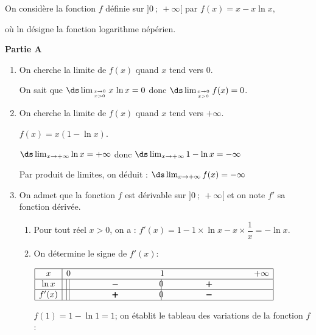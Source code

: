 \medskip

On considère la fonction $f$  définie sur $]0~;~+\infty[$ par 
$f(x) = x - x \ln x,$

où ln désigne la fonction logarithme népérien.

\bigskip

\textbf{Partie A}

\medskip

\begin{enumerate}
\item On cherche la limite de $f(x)$ quand $x$ tend vers $0$.

On sait que $\ds\lim_{x\to 0 \atop x>0} x\,\ln x=0$ donc $\ds\lim_{x\to 0 \atop x>0} f(x) = 0$.

\item On cherche la limite de $f(x)$ quand $x$ tend vers $+\infty$.

$f(x)=x\left (1 - \ln x\right )$.

$\ds\lim_{x\to +\infty} \ln x = +\infty$ donc $\ds\lim_{x\to +\infty} 1- \ln x = -\infty$

Par produit de limites, on déduit : $\ds\lim_{x\to +\infty} f(x) = -\infty$

\item On admet que la fonction $f$ est dérivable sur $]0~;~+\infty[$ et on note $f'$ sa fonction dérivée.
	\begin{enumerate}
		\item Pour tout réel $x > 0$, on a :
		$f'(x) = 1 - 1\times \ln x - x\times \dfrac{1}{x} = - \ln x$.
		
		\item 
		
On détermine le signe de $f'(x)$:

\begin{center}
{\renewcommand{\arraystretch}{1.5}
\def\esp{\hspace*{3cm}}
$\begin{array}{|c |l *{4}{c} |} 
\hline
x  & 0 & \esp & 1 & \esp  & +\infty \\
\hline
\ln x &\vline\;\vline  & \pmb{-} &  \vline\hspace{-2.7pt}{0} & \pmb{+} &   \\
\hline
f'(x) &\vline\;\vline  & \pmb{+} &  \vline\hspace{-2.7pt}{0} & \pmb{-} &   \\
\hline
\end{array}$
}
\end{center}
		
$f(1) = 1 -\ln 1=1$; on établit le tableau des variations de la fonction $f$:		
		

\end{enumerate}
\end{enumerate}
